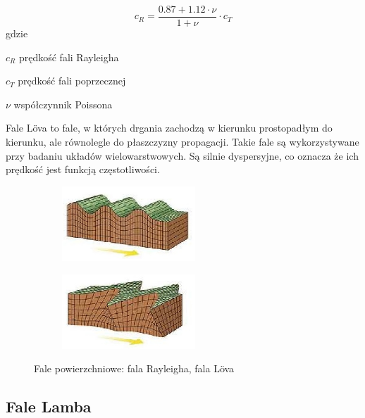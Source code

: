\begin{equation}
c_R=\frac{0.87+1.12\cdot\nu}{1+\nu}\cdot c_T
\end{equation}
gdzie
\begin{eqwhere}[2cm]
        \item[$c_R$] prędkość fali Rayleigha
        \item[$c_T$] prędkość fali poprzecznej
        \item[$\nu$] współczynnik Poissona
\end{eqwhere}

Fale L\"{o}va to fale, w których drgania zachodzą w kierunku prostopadłym do kierunku, ale równolegle do płaszczyzny propagacji. Takie fale są wykorzystywane przy badaniu układów wielowarstwowych. Są silnie dyspersyjne, co oznacza że ich prędkość jest funkcją częstotliwości.

\begin{figure}[h]
        \centering
        \begin{subfigure}{0.35\textwidth}
                \centering
	     \includegraphics[width=5cm]{Zdjecia/2/fala_rayleigha}
                \subcaption{\label{subfigure_a}}
        \end{subfigure}
        \begin{subfigure}{0.35\textwidth}
                \centering
	     \includegraphics[width=5cm]{Zdjecia/2/fala_lova}
                \subcaption{\label{subfigure_b}}
        \end{subfigure}
        \label{fig:subcaption_example}
        \caption{Fale powierzchniowe: \protect{} fala Rayleigha, \protect{} fala L\"{o}va}
\end{figure}

\subsection{Fale Lamba}

